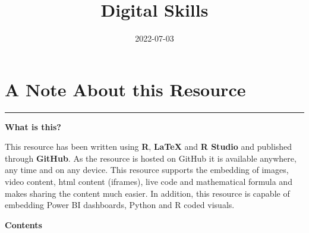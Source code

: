 \documentclass[
]{book}
\title{Digital Skills}
\author{}
\date{\vspace{-2.5em}2022-07-03}
\begin{document}
\maketitle

{
\setcounter{tocdepth}{1}
\tableofcontents
}
\hypertarget{A-Note-About-this-Resource}{%
\chapter*{A Note About this Resource}\label{A-Note-About-this-Resource}}

\begin{center}\rule{0.5\linewidth}{0.5pt}\end{center}

\textbf{What is this?}

This resource has been written using \textbf{R}, \textbf{LaTeX} and \textbf{R Studio} and published through \textbf{GitHub}. As the resource is hosted on GitHub it is available anywhere, any time and on any device. This resource supports the embedding of images, video content, html content (iframes), live code and mathematical formula and makes sharing the content much easier. In addition, this resource is capable of embedding Power BI dashboards, Python and R coded visuals.

\textbf{Contents}
\end{document}
